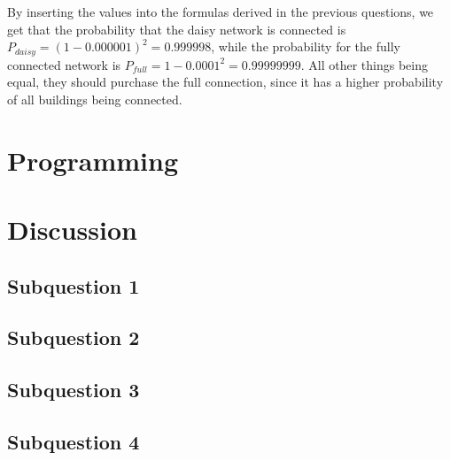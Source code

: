 \documentclass[11pt,a4paper]{article}
\begin{document}
By inserting the values into the formulas derived in the previous questions,
we get that the probability that the daisy network is connected is $P_{daisy}
= (1-0.000001)^2 = 0.999998$, while the probability for the fully connected
network is $P_{full} = 1-0.0001^2 = 0.99999999$. All other things being equal,
they should purchase the full connection, since it has a higher probability of
all buildings being connected.

\section*{Programming}


\section*{Discussion}

\subsection*{Subquestion 1}


\subsection*{Subquestion 2}

\subsection*{Subquestion 3}


\subsection*{Subquestion 4}

\end{document}
